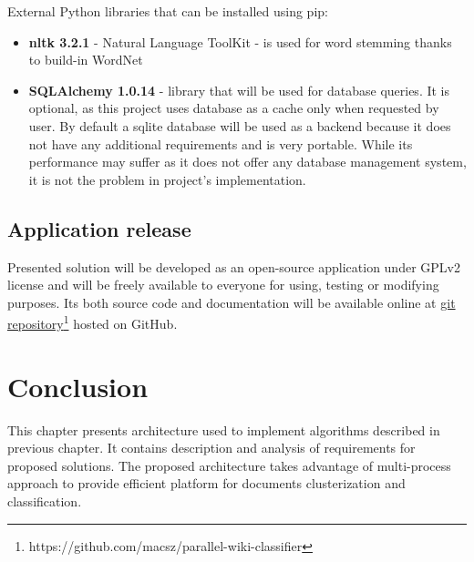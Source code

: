 External Python libraries that can be installed using pip:
\begin{itemize}
	\item \textbf{nltk 3.2.1} - Natural Language ToolKit - is used for word stemming thanks to build-in WordNet
	\item \textbf{SQLAlchemy 1.0.14} - library that will be used for database queries. It is optional, as this project uses database as a cache only when requested by user. By default a sqlite database will be used as a backend because it does not have any additional requirements and is very portable. While its performance may suffer as it does not offer any database management system, it is not the problem in project's implementation.
\end{itemize}


\subsection{Application release}
Presented solution will be developed as an open-source application under GPLv2 license and will be freely available to everyone for using, testing or modifying purposes. Its both source code and documentation will be available online at \href{https://github.com/macsz/parallel-wiki-classifier}{git repository\footnote{https://github.com/macsz/parallel-wiki-classifier} hosted on GitHub}.


\section{Conclusion}
This chapter presents architecture used to implement algorithms described in previous chapter. It contains description and analysis of requirements for proposed solutions. The proposed architecture takes advantage of multi-process approach to provide efficient platform for documents clusterization and classification.
